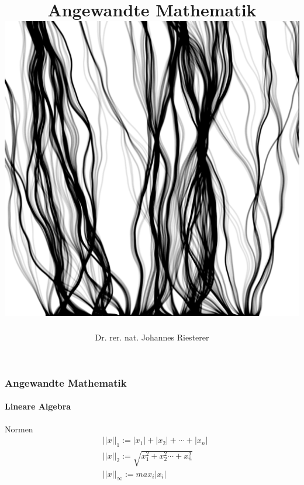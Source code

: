 \documentclass{beamer}
\begin{document}
\title[Angewandte Mathematik] %
{Angewandte Mathematik
\\
\includegraphics[scale=0.15]{images/cover}
}
\subtitle{}
\author[Dr. Johannes Riesterer] %
{Dr.  rer. nat. Johannes Riesterer}

\date[KPT 2004] %
{}

\subject{Angewandte Mathematik}

\frame{\titlepage}




\begin{frame}
    \frametitle{Angewandte Mathematik}
\framesubtitle{Lineare Algebra}


 \begin{block}{Normen}
\begin{align*}
 & ||x||_1 :=|x_1| + |x_2| + \cdots + |x_n| \\
 & ||x||_2 :=  \sqrt{x_1^2 + x_2^2 \cdots + x_n^2} \\
& ||x||_\infty := max_{i} |x_i|
\end{align*}
\end{block}


 \end{frame}
\end{document}
